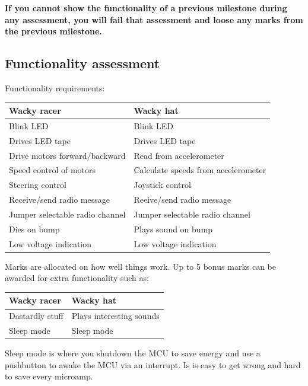 \documentclass[11pt, a4paper]{article}
\begin{document}
\textbf{If you cannot show the functionality of a previous milestone
  during any assessment, you will fail that assessment and loose any
  marks from the previous milestone.}


\subsection{Functionality assessment}

Functionality requirements:
%
\begin{flushleft}
  \begin{tabular}{l|l}
    Wacky racer & Wacky hat \\ \hline \hline
    Blink LED                      & Blink LED \\
    Drives LED tape                & Drives LED tape \\
    Drive motors forward/backward  & Read from accelerometer \\
    Speed control of motors        & Calculate speeds from accelerometer \\
    Steering control               & Joystick control \\
    Receive/send radio message     & Reeive/send radio message \\
    Jumper selectable radio channel & Jumper selectable radio channel  \\
    Dies on bump                   & Plays sound on bump \\
    Low voltage indication         & Low voltage indication \\
  \end{tabular}
\end{flushleft}
%
Marks are allocated on how well things work.  Up to 5 bonus marks can
be awarded for extra functionality such as:
%
\begin{flushleft}
  \begin{tabular}{l|l}
    Wacky racer                & Wacky hat \\ \hline \hline
    Dastardly stuff            & Plays interesting sounds \\
    Sleep mode                 & Sleep mode \\
  \end{tabular}
\end{flushleft}

Sleep mode is where you shutdown the MCU to save energy and use a
pushbutton to awake the MCU via an interrupt.  Is is easy to get wrong
and hard to save every microamp.
\end{document}
